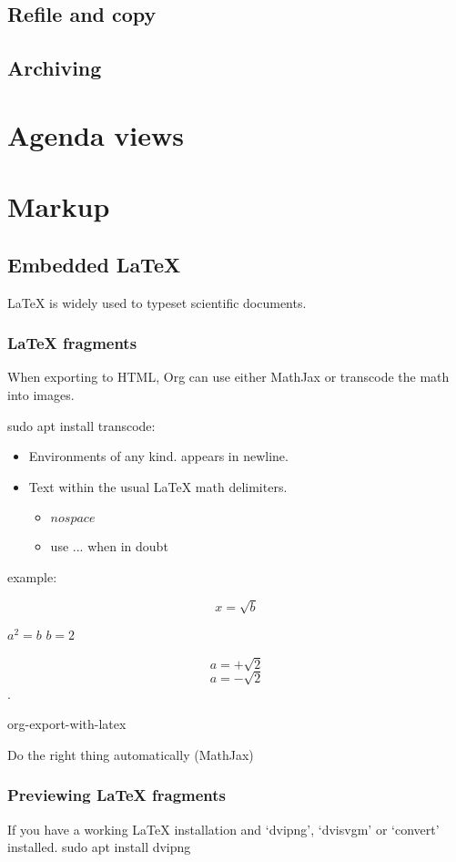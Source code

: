 \documentclass[11pt]{article}
\begin{document}
\subsection{Refile and copy}
\label{sec:org6a94f22}
\subsection{Archiving}
\label{sec:orga3023a3}
\section{Agenda views}
\label{sec:org61b061d}
\section{Markup}
\label{sec:org1bf9702}
\subsection{Embedded \LaTeX{}}
\label{sec:org27d5ef9}
\LaTeX{} is widely used to typeset scientific documents.
\subsubsection{\LaTeX{} fragments}
\label{sec:org2de6f79}
When exporting to HTML, Org can use either MathJax or transcode the math
into images.

sudo apt install transcode:
\begin{itemize}
\item Environments of any kind. \bengin appears in newline.
\item Text within the usual \LaTeX{} math delimiters.
\begin{itemize}
\item \(no space\)
\item use \(...\) when in doubt
\end{itemize}
\end{itemize}

example:

\begin{equation}
x=\sqrt{b}
\end{equation}

\(a^2=b\) 
\(b=2\)

$$ a=+\sqrt{2} $$
\[ a=-\sqrt{2} \].

org-export-with-latex

Do the right thing automatically (MathJax)

\subsubsection{Previewing \LaTeX{} fragments}
\label{sec:org90d8670}
If you have a working \LaTeX{} installation and ‘dvipng’, ‘dvisvgm’ or
‘convert’ installed.
sudo apt install dvipng
\end{document}
